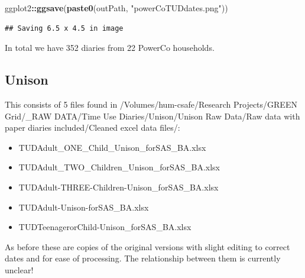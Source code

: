 \documentclass[]{article}
\newenvironment{Shaded}{\begin{snugshade}}{\end{snugshade}}
\newcommand{\KeywordTok}[1]{\textcolor[rgb]{0.13,0.29,0.53}{\textbf{#1}}}
\newcommand{\StringTok}[1]{\textcolor[rgb]{0.31,0.60,0.02}{#1}}
\newcommand{\OperatorTok}[1]{\textcolor[rgb]{0.81,0.36,0.00}{\textbf{#1}}}
\newcommand{\NormalTok}[1]{#1}
\providecommand{\tightlist}{%
  \setlength{\itemsep}{0pt}\setlength{\parskip}{0pt}}
\begin{document}
\begin{Shaded}
\begin{Highlighting}[]
\NormalTok{ggplot2}\OperatorTok{::}\KeywordTok{ggsave}\NormalTok{(}\KeywordTok{paste0}\NormalTok{(outPath, }\StringTok{"powerCoTUDdates.png"}\NormalTok{))}
\end{Highlighting}
\end{Shaded}

\begin{verbatim}
## Saving 6.5 x 4.5 in image
\end{verbatim}

In total we have 352 diaries from 22 PowerCo households.

\subsection{Unison}\label{unison}

This consists of 5 files found in /Volumes/hum-csafe/Research
Projects/GREEN Grid/\_RAW DATA/Time Use Diaries/Unison/Unison Raw
Data/Raw data with paper diaries included/Cleaned excel data files/:

\begin{itemize}
\tightlist
\item
  TUDAdult\_ONE\_Child\_Unison\_forSAS\_BA.xlsx
\item
  TUDAdult\_TWO\_Children\_Unison\_forSAS\_BA.xlsx
\item
  TUDAdult-THREE-Children-Unison\_forSAS\_BA.xlsx
\item
  TUDAdult-Unison-forSAS\_BA.xlsx
\item
  TUDTeenagerorChild-Unison\_forSAS\_BA.xlsx
\end{itemize}

As before these are copies of the original versions with slight editing
to correct dates and for ease of processing. The relationship between
them is currently unclear!
\end{document}
